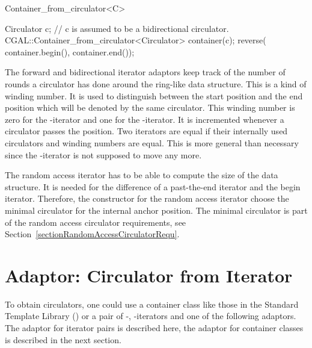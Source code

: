 \begin{ccClassTemplate}{Container_from_circulator<C>}
\begin{ccExampleCode}
Circulator c;  // c is assumed to be a bidirectional circulator.
CGAL::Container_from_circulator<Circulator> container(c);
reverse( container.begin(), container.end());
\end{ccExampleCode}

\ccImplementation

The forward and bidirectional iterator adaptors keep track of the
number of rounds a circulator has done around the ring-like data
structure. This is a kind of winding number. It is used to distinguish
between the start position and the end position which will be denoted
by the same circulator. This winding number is zero for the
-iterator and one for the -iterator.
It is incremented whenever a circulator passes the 
position. Two iterators are equal if their internally used circulators
and winding numbers are equal. This is more general than necessary
since the -iterator is not supposed to move any more.

The random access iterator has to be able to compute the size of the
data structure. It is needed for the difference of a past-the-end
iterator and the begin iterator.  Therefore, the constructor for the
random access iterator choose the minimal circulator for the internal
anchor position. The minimal circulator is part of the random access
circulator requirements, see
Section~\ref{sectionRandomAccessCirculatorRequ}.

\end{ccClassTemplate}


\newpage

\section{Adaptor: Circulator from Iterator}
\label{sectionCircFromIter}
 
To obtain circulators, one could use a container class like those in
the Standard Template Library (\stl) or a pair of -,
-iterators and one of the following adaptors. The adaptor
for iterator pairs is described here, the adaptor for container classes
is described in the next section.

